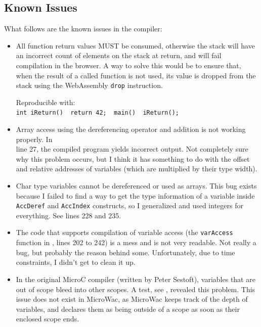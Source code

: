 \documentclass[a4paper]{article}
\begin{document}
\subsection{Known Issues}
\label{sec:testing:known-issues}
What follows are the known issues in the compiler:
\begin{itemize}
	\item All function return values MUST be consumed, otherwise the stack will have an incorrect count of elements on the stack at return, and will fail compilation in the browser. A way to solve this would be to ensure that, when the result of a called function is not used, its value is dropped from the stack using the WebAssembly \texttt{drop} instruction.

	Reproducible with:\\
	\texttt{int iReturn() { return 42; } main() { iReturn(); }}

	\item Array access using the dereferencing operator and addition is not working properly. In\\ line 27, the compiled program yields incorrect output. Not completely sure why this problem occurs, but I think it has something to do with the offset and relative addresses of variables (which are multiplied by their type width).

	\item Char type variables cannot be dereferenced or used as arrays. This bug exists because I failed to find a way to get the type information of a variable inside \texttt{AccDeref} and \texttt{AccIndex} constructs, so I generalized and used integers for everything. See  lines 228 and 235.

	\item The code that supports compilation of variable access (the \texttt{varAccess} function in , lines 202 to 242) is a mess and is not very readable. Not really a bug, but probably the reason behind some.  Unfortunately, due to time constraints, I didn't get to clean it up.

	\item In the original MicroC compiler (written by Peter Sestoft), variables that are out of scope bleed into other scopes. A test, see , revealed this problem. This issue does not exist in MicroWac, as MicroWac keeps track of the depth of variables, and declares them as being outside of a scope as soon as their enclosed scope ends.
\end{itemize}
\end{document}
